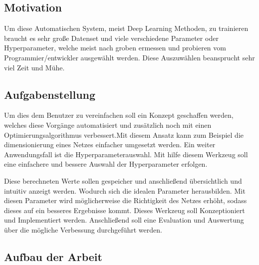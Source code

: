 \newpage


\subsection{Motivation}
\label{sec:Motivation}
Um diese Automatischen System, meist Deep Learning Methoden, zu trainieren braucht es sehr große Datenset und viele verschiedene Parameter oder Hyperparameter, welche meist nach groben ermessen und probieren vom Programmier/entwickler ausgewählt werden. Diese Auszuwählen beansprucht sehr viel Zeit und Mühe. 


\subsection{Aufgabenstellung}
\label{sec:Aufgabenstellung}
Um dies dem Benutzer zu vereinfachen soll ein Konzept geschaffen werden, welches diese Vorgänge automatisiert und zusätzlich noch mit einen Optimierungsalgorithmus verbessert.Mit diesem Ansatz kann zum Beispiel die dimensionierung eines Netzes einfacher umgesetzt werden. Ein weiter Anwendungsfall ist die Hyperparameterauswahl. Mit hilfe diesem Werkzeug soll eine einfachere und bessere Auswahl der Hyperparameter erfolgen.\par Diese berechneten Werte sollen gespeicher und anschließend übersichtlich und intuitiv anzeigt werden. Wodurch sich die idealen Parameter herausbilden. Mit diesen Parameter wird möglicherweise die Richtigkeit des Netzes erhöht, sodass dieses auf ein besseres Ergebnisse kommt. Dieses Werkzeug soll Konzeptioniert und Implementiert werden. Anschließend soll eine Evaluation und Auswertung über die mögliche Verbessung durchgeführt werden. 


\subsection{Aufbau der Arbeit}
\label{sec:Aufbau der Arbeit}

